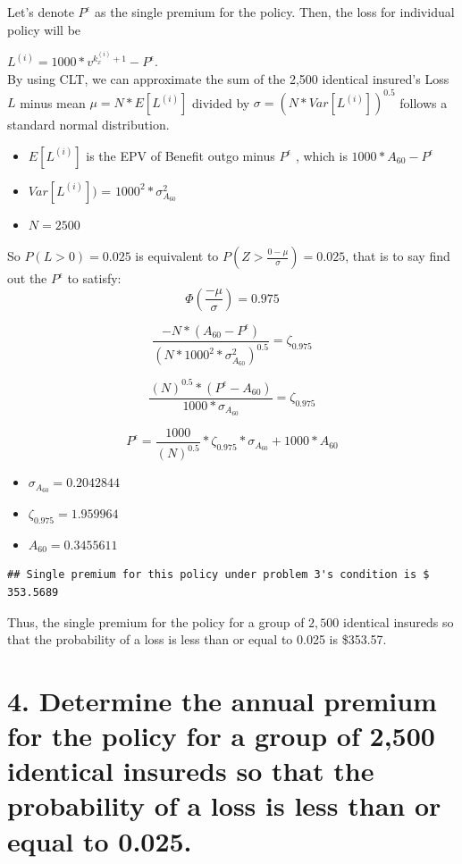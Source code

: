 \documentclass[
]{article}
\begin{document}
Let's denote \(P^{\epsilon}\) as the single premium for the policy.
Then, the loss for individual policy will be

\(L^{(i)} = 1000*v^{k^{(i)}_x+1}-P^{\epsilon}\).\\
By using CLT, we can approximate the sum of the 2,500 identical
insured's Loss \(L\) minus mean \(\mu = N*E[L^{(i)}]\) divided by
\(\sigma = (N* Var[L^{(i)}])^{0.5}\) follows a standard normal
distribution.

\begin{itemize}
\item
  \(E[L^{(i)}]\) is the EPV of Benefit outgo minus \(P^{\epsilon}\) ,
  which is \(1000*A_{60} - P^{\epsilon}\)
\item
  \(Var[L^{(i)}])\) = \(1000^2*\sigma^2_{A_{60}}\)
\item
  \(N = 2500\)
\end{itemize}

So \(P(L > 0 ) = 0.025\) is equivalent to
\(P(Z > \frac{0-\mu}{\sigma}) = 0.025\), that is to say find out the
\(P^{\epsilon}\) to satisfy: \[
\Phi(\frac{-\mu}{\sigma}) = 0.975
\]

\[
\frac{-N*(A_{60}-P^{\epsilon})}{(N* 1000^2*\sigma^2_{A_{60}})^{0.5}} = \zeta_{0.975}
\]

\[
\frac{(N)^{0.5}*(P^{\epsilon}-A_{60})}{1000*\sigma_{A_{60}}} = \zeta_{0.975}
\]

\[
P^{\epsilon} = \frac{1000}{(N)^{0.5}}*\zeta_{0.975}*\sigma_{A_{60}} + 1000*A_{60}
\]

\begin{itemize}
\item
  \(\sigma_{A_{60}} = 0.2042844\)
\item
  \(\zeta_{0.975} = 1.959964\)
\item
  \(A_{60} = 0.3455611\)
\end{itemize}

\begin{verbatim}
## Single premium for this policy under problem 3's condition is $ 353.5689
\end{verbatim}

Thus, the single premium for the policy for a group of \(2,500\)
identical insureds so that the probability of a loss is less than or
equal to 0.025 is \$353.57.

\hypertarget{determine-the-annual-premium-for-the-policy-for-a-group-of-2500-identical-insureds-so-that-the-probability-of-a-loss-is-less-than-or-equal-to-0.025.}{%
\section{4. Determine the annual premium for the policy for a group of
2,500 identical insureds so that the probability of a loss is less than
or equal to
0.025.}\label{determine-the-annual-premium-for-the-policy-for-a-group-of-2500-identical-insureds-so-that-the-probability-of-a-loss-is-less-than-or-equal-to-0.025.}}
\end{document}
